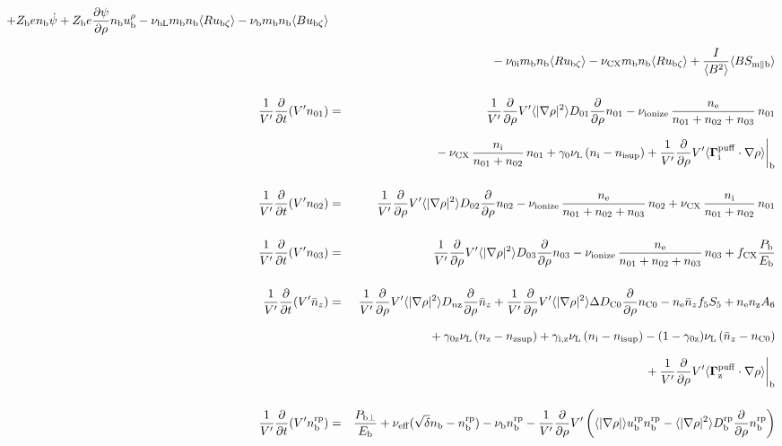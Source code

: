 \documentclass[11pt]{article}
\def\bvec#1{\leavevmode\hbox{\boldmath$#1$}}
\let\vec=\bvec
\def\r#1{{\rm#1}}
\def\aves#1{\langle#1\rangle}
\def\dd#1#2{\frac{\partial #1}{\partial #2}}
\def\para{\parallel}
\def\ddrho{\frac{\partial}{\partial\rho}}
\def\ddV{\frac{\partial}{\partial V}}
\def\ddt{\frac{\partial}{\partial t}}
\def\mi{m_\r{i}}
\def\mb{m_\r{b}}
\def\nee{n_\r{e}}
\def\ni{n_\r{i}}
\def\nz{n_\r{z}}
\def\nb{n_\r{b}}
\def\Te{T_\r{e}}
\def\Zi{Z_\r{i}}
\def\Zb{Z_\r{b}}
\def\uzt#1{u_{\r{#1}\zeta}}
\def\upara#1{u_{\r{#1}\para}}
\def\qhatpara#1{\hat{q}_{\r{#1}\para}}
\def\urho#1{u_\r{#1}^\rho}
\def\De{D_\r{e}}
\def\nun#1{\nu_\r{0#1}}
\def\nsup#1{n_\r{#1sup}}
\def\nbrp{n_\r{b}^\r{rp}}
\def\ubrp{u_\r{b}^\r{rp}}
\def\Dbrp{D_\r{b}^\r{rp}}
\def\bri{\aves{B^2}\aves{R^2} - I^2}
\def\Pbperp{P_{\r{b}\perp}}
\def\Pb{P_\r{b}}
\def\Eb{E_\r{b}}
\def\nna{n_{01}}
\def\nnb{n_{02}}
\def\nnc{n_{03}}
\def\nnz{\bar{n}_{z}}
\def\nueff{\nu_\r{eff}}
\def\fCX{f_\r{CX}}
\def\nuL{\nu_\r{L}}
\def\nuCX{\nu_\r{CX}}
\def\nuion{\nu_\r{ionize}}
\def\nub{\nu_\r{b}}
\def\nuOL{\nu_\r{OL}}
\def\nubL{\nu_\r{bL}}
\def\red#1{\textcolor{red}{#1}}
\begin{document}
\begin{eqnarray}
%
  + \Zb e              \nb \dot{\psi}
%
  + \Zb e \dd{\psi}{\rho} \nb \urho{b}
%
%
  - \nubL \mb \nb \aves{R \uzt{b}}
%
  - \nub  \mb \nb \aves{B \uzt{b}}
\nonumber\\[2.5mm]&&{}
%
  - \nun{i} \mb \nb \aves{R \uzt{b}}
%
  - \nuCX \mb \nb \aves{R \uzt{b}}
%
%
  + \frac{I}{\aves{B^2}} \aves{B S_{\r{m}\para\r{b}}}
%
\\[5mm]
  \frac{1}{V'} \ddt (V' \nna) &=& 
%
    \frac{1}{V'} \ddrho V' \aves{|\nabla\rho|^2} D_{01} \ddrho \nna
%
  - \nuion\, \frac{\nee}{\nna + \nnb + \nnc}\, \nna
%
\nonumber\\[2.5mm]&&{}
  - \nuCX\, \frac{\ni}{\nna + \nnb}\, \nna
%
  + \gamma_0 \nuL \, (\ni - \nsup{i})
%
  + \frac{1}{V'} \ddrho V' \aves{\vec{\Gamma}^\r{puff}_\r{i}\cdot\nabla\rho}\biggr|_\r{b}
\\[5mm]
  \frac{1}{V'} \ddt (V' \nnb) &=& 
%
    \frac{1}{V'} \ddrho V' \aves{|\nabla\rho|^2} D_{02} \ddrho \nnb
%
  - \nuion\, \frac{\nee}{\nna + \nnb + \nnc}\, \nnb
%
  + \nuCX\, \frac{\ni}{\nna + \nnb}\, \nna
%
\\[5mm]
  \frac{1}{V'} \ddt (V' \nnc) &=& 
%
    \frac{1}{V'} \ddrho V' \aves{|\nabla\rho|^2} D_{03} \ddrho \nnc
%
  - \nuion\, \frac{\nee}{\nna + \nnb + \nnc}\, \nnc
%
  + \fCX \frac{\Pb}{\Eb}
\\[5mm]
  \frac{1}{V'} \ddt (V' \nnz) &=& 
%
    \frac{1}{V'} \ddrho V' \aves{|\nabla\rho|^2} D_{n\r{z}} \ddrho \nnz
%
  + \frac{1}{V'} \ddrho V' \aves{|\nabla\rho|^2} \Delta D_{\r{C0}} \ddrho n_\r{C0}
%
  - \nee \nnz f_5S_5 + \nee \nz A_6 
\nonumber\\[2.5mm]&&{}
%
  + \gamma_\r{0z} \nuL \, (\nz - \nsup{z})
%
  + \gamma_\r{i,z} \nuL \, (\ni - \nsup{i})
%
  - (1-\gamma_\r{0z}) \nuL \, (\nnz - n_\r{C0})
\nonumber\\[2.5mm]&&{}
%
  + \frac{1}{V'} \ddrho V' \aves{\vec{\Gamma}^\r{puff}_\r{z}\cdot\nabla\rho}\biggr|_\r{b}
\\[5mm]
  \frac{1}{V'} \ddt (V' \nbrp) &=&
%
    \frac{\Pbperp}{\Eb}
%
  + \nueff (\sqrt{\delta} \nb - \nbrp)
%
  - \nub \nbrp
%
  - \frac{1}{V'} \ddrho V' \left( \aves{|\nabla\rho|} \ubrp \nbrp - \aves{|\nabla\rho|^2} \Dbrp \ddrho \nbrp \right)
%
\end{eqnarray}
\end{document}
